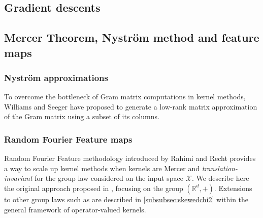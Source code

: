 \subsection{Gradient descents}

\subsection{Mercer Theorem, Nystr\"om method and feature maps}
\subsubsection{Nystr\"om approximations}
To overcome the bottleneck of Gram matrix computations in kernel methods,
Williams and Seeger \cite{Williams2000-nystrom} have proposed to generate a
low-rank matrix approximation of the Gram matrix using a subset of its columns.
\subsubsection{Random Fourier Feature maps}
Random Fourier Feature methodology introduced  by Rahimi and Recht
\cite{Rahimi2007} provides a way to scale up kernel methods when kernels are
Mercer and \emph{translation-invariant}  for the group law considered on the
input space $\mathcal{X}$. We describe here the original approach proposed in
\cite{Rahimi2007}, focusing on the group $(\mathbb{R}^d, +)$. Extensions to
other group laws such as \cite{li2010random} are described in
\cref{subsubsec:skewedchi2} within the general framework of operator-valued
kernels.
